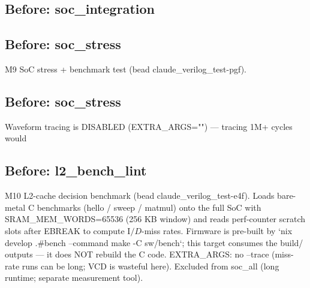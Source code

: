 \begin{record}

\subsection*{Before: soc\_integration}


\subsection*{Before: soc\_stress}

\begin{textblock}
M9 SoC stress + benchmark test (bead claude_verilog_test-pgf).
\end{textblock}

\subsection*{Before: soc\_stress}

\begin{textblock}
Waveform tracing is DISABLED (EXTRA_ARGS="") — tracing 1M+ cycles would
\end{textblock}

\subsection*{Before: l2\_bench\_lint}

\begin{textblock}
M10 L2-cache decision benchmark (bead claude_verilog_test-e4f).
Loads bare-metal C benchmarks (hello / sweep / matmul) onto the full SoC
with SRAM_MEM_WORDS=65536 (256 KB window) and reads perf-counter scratch
slots after EBREAK to compute I$/D$-miss rates.
Firmware is pre-built by `nix develop .#bench --command make -C sw/bench`;
this target consumes the build/ outputs — it does NOT rebuild the C code.
EXTRA_ARGS: no --trace (miss-rate runs can be long; VCD is wasteful here).
Excluded from soc_all (long runtime; separate measurement tool).
\end{textblock}


\end{record}
